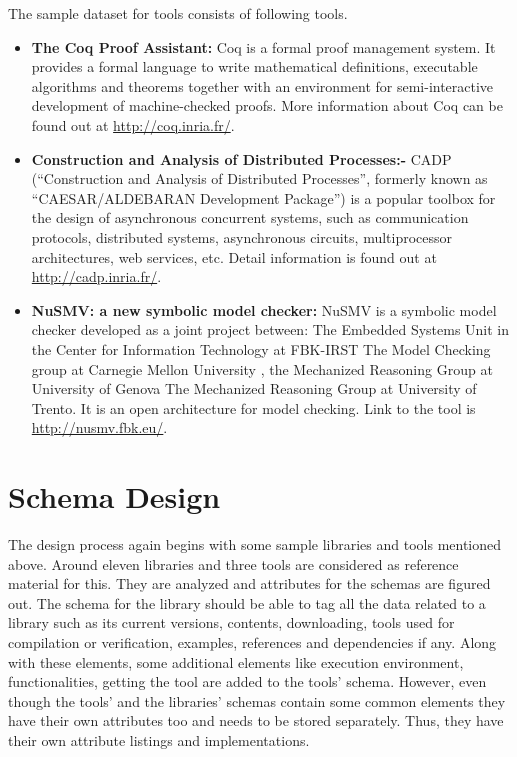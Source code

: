 \documentclass[11pt,letterpaper]{report}
\begin{document}
The sample dataset for tools consists of following tools.
\begin{itemize}
\item \textbf{The Coq Proof Assistant: } Coq is a formal proof management system. It provides a formal language to write mathematical definitions, executable algorithms and theorems together with an environment for semi-interactive development of machine-checked proofs. More information about Coq can be found out at \url{http://coq.inria.fr/}. \cite{COQ}
\item \textbf{Construction and Analysis of Distributed Processes:- } CADP (``Construction and Analysis of Distributed Processes'', formerly known as ``CAESAR/ALDEBARAN Development Package'') is a popular toolbox for the design of asynchronous concurrent systems, such as communication protocols, distributed systems, asynchronous circuits, multiprocessor architectures, web services, etc. Detail information is found out at \url{http://cadp.inria.fr/}. \cite{CADP}
\item \textbf{NuSMV: a new symbolic model checker: } NuSMV is a symbolic model checker developed as a joint project between: The Embedded Systems Unit in the Center for Information Technology at FBK-IRST The Model Checking group at Carnegie Mellon University , the Mechanized Reasoning Group at University of Genova The Mechanized Reasoning Group at University of Trento. It is an open architecture for model checking. Link to the tool is \url{http://nusmv.fbk.eu/}. \cite{NUSMV}
\end{itemize}
\section{Schema Design}
The design process again begins with some sample libraries and tools mentioned above. Around eleven libraries and three tools are considered as reference material for this.  They are analyzed and attributes for the schemas are figured out. The schema for the library should be able to tag all the data related to a library such as its current versions, contents, downloading, tools used for compilation or verification, examples, references and dependencies if any. Along with these elements, some additional elements like execution environment, functionalities, getting the tool are added to the tools' schema. However, even though the tools' and the libraries' schemas contain some common elements they have their own attributes too and needs to be stored separately. Thus, they have their own attribute listings and implementations.
\end{document}

